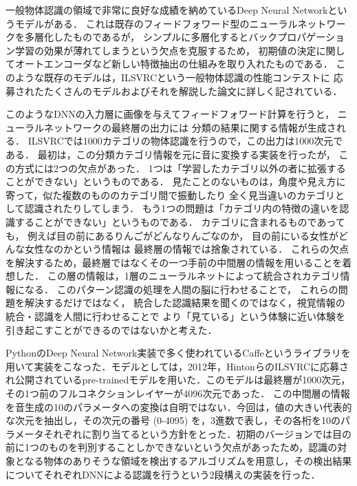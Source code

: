 
一般物体認識の領域で非常に良好な成績を納めているDeep Neural Networkというモデルがある．
これは既存のフィードフォワード型のニューラルネットワークを多層化したものであるが，
シンプルに多層化するとバックプロパゲーション学習の効果が薄れてしまうという欠点を克服するため，
初期値の決定に関してオートエンコーダなど新しい特徴抽出の仕組みを取り入れたものである．
このような既存のモデルは，ILSVRCという一般物体認識の性能コンテストに
応募されたたくさんのモデルおよびそれを解説した論文に詳しく記されている．

このようなDNNの入力層に画像を与えてフィードフォワード計算を行うと，
ニューラルネットワークの最終層の出力には
分類の結果に関する情報が生成される．
ILSVRCでは1000カテゴリの物体認識を行うので，この出力は1000次元である．
最初は，この分類カテゴリ情報を元に音に変換する実装を行ったが，
この方式には2つの欠点があった．
1つは「学習したカテゴリ以外の者に拡張することができない」というものである．
見たことのないものは，角度や見え方に寄って，似た複数のもののカテゴリ間で振動したり
全く見当違いのカテゴリとして認識されたりしてしまう．
もう1つの問題は「カテゴリ内の特徴の違いを認識することができない」というものである．
カテゴリに含まれるものであっても，
例えば目の前にあるりんごがどんなりんごなのか，
目の前にいる女性がどんな女性なのかという情報は
最終層の情報では捨象されている．
これらの欠点を解決するため，最終層ではなくその一つ手前の中間層の情報を用いることを着想した．
この層の情報は，1層のニューラルネットによって統合されカテゴリ情報になる．
このパターン認識の処理を人間の脳に行わせることで，
これらの問題を解決するだけではなく，
統合した認識結果を聞くのではなく，視覚情報の統合・認識を人間に行わせることで
より「見ている」という体験に近い体験を引き起こすことができるのではないかと考えた．


PythonのDeep Neural Network実装で多く使われているCaffeというライブラリを用いて実装をこなった．モデルとしては，2012年，HintonらのILSVRCに応募され公開されているpre-trainedモデルを用いた．このモデルは最終層が1000次元，その1つ前のフルコネクションレイヤーが4096次元であった．
この中間層の情報を音生成の10のパラメータへの変換は自明ではない．今回は，値の大きい代表的な次元を抽出し，その次元の番号 (0-4095) を，3進数で表し，その各桁を10のパラメータそれぞれに割り当てるという方針をとった．初期のバージョンでは目の前に1つのものを判別することしかできないという欠点があったため，認識の対象となる物体のありそうな領域を検出するアルゴリズムを用意し，その検出結果についてそれぞれDNNによる認識を行うという2段構えの実装を行った．

